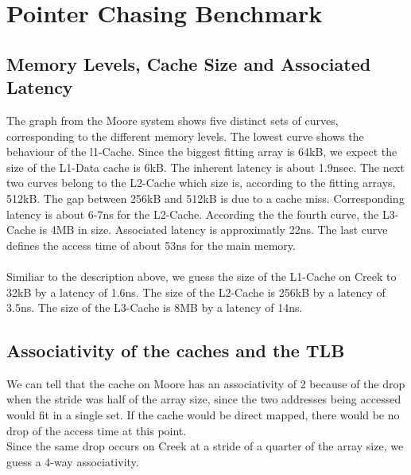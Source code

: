 \documentclass{article}
\newcommand{\enterProblemHeader}[1]{
}
\newcommand{\exitProblemHeader}[1]{
}
\newcounter{homeworkProblemCounter} %
\newcommand{\homeworkProblemName}{}
\newenvironment{homeworkProblem}[1][Problem \arabic{homeworkProblemCounter}]{ %
\stepcounter{homeworkProblemCounter} %
\renewcommand{\homeworkProblemName}{#1} %
\section{\homeworkProblemName} %
}{
}
\begin{document}
\begin{homeworkProblem}[Pointer Chasing Benchmark]
\subsection{Memory Levels, Cache Size and Associated Latency}
The graph from the Moore system shows five distinct sets of curves, corresponding to the 
different memory levels. The lowest curve shows the behaviour of the l1-Cache. Since
the biggest fitting array is 64kB, we expect the size of the L1-Data cache is 6kB. The
inherent latency is about 1.9nsec. The next two curves belong to the L2-Cache which size
is, according to the fitting arrays, 512kB. The gap between 256kB and 512kB is due to a
cache miss. Corresponding latency is about 6-7ns for the L2-Cache. According the the fourth
curve, the L3-Cache is 4MB in size. Associated latency is approximatly 22ns. The last curve
defines the access time of about 53ns for the main memory.
\\\\
Similiar to the description above, we guess the size of the L1-Cache on Creek to 32kB by a
latency of 1.6ns. The size of the L2-Cache is 256kB by a latency of 3.5ns. The size of the 
L3-Cache is 8MB by a latency of 14ns.
\subsection{Associativity of the caches and the TLB}
We can tell that the cache on Moore has an associativity of 2 because of the drop when
the stride was half of the array size, since the two addresses being accessed would fit
in a single set. If the cache would be direct mapped, there would be no drop of the access 
time at this point.
\\
Since the same drop occurs on Creek at a stride of a quarter of the array size, we guess 
a 4-way associativity.

\end{homeworkProblem}

\end{document}
